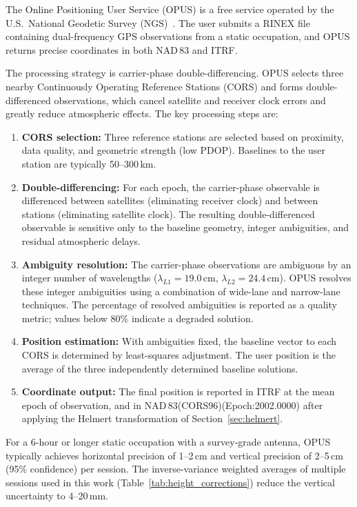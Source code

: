 The Online Positioning User Service (OPUS) is a free service operated by the U.S.\ National Geodetic Survey (NGS)~\cite{soler2003}. The user submits a RINEX file containing dual-frequency GPS observations from a static occupation, and OPUS returns precise coordinates in both NAD\,83 and ITRF.

The processing strategy is carrier-phase double-differencing. OPUS selects three nearby Continuously Operating Reference Stations (CORS) and forms double-differenced observations, which cancel satellite and receiver clock errors and greatly reduce atmospheric effects. The key processing steps are:
\begin{enumerate}[nosep]
\item \textbf{CORS selection:} Three reference stations are selected based on proximity, data quality, and geometric strength (low PDOP). Baselines to the user station are typically 50--300\,km.
\item \textbf{Double-differencing:} For each epoch, the carrier-phase observable is differenced between satellites (eliminating receiver clock) and between stations (eliminating satellite clock). The resulting double-differenced observable is sensitive only to the baseline geometry, integer ambiguities, and residual atmospheric delays.
\item \textbf{Ambiguity resolution:} The carrier-phase observations are ambiguous by an integer number of wavelengths ($\lambda_{L1} = 19.0$\,cm, $\lambda_{L2} = 24.4$\,cm). OPUS resolves these integer ambiguities using a combination of wide-lane and narrow-lane techniques. The percentage of resolved ambiguities is reported as a quality metric; values below 80\% indicate a degraded solution.
\item \textbf{Position estimation:} With ambiguities fixed, the baseline vector to each CORS is determined by least-squares adjustment. The user position is the average of the three independently determined baseline solutions.
\item \textbf{Coordinate output:} The final position is reported in ITRF at the mean epoch of observation, and in NAD\,83(CORS96)(Epoch:2002.0000) after applying the Helmert transformation of Section~\ref{sec:helmert}.
\end{enumerate}
For a 6-hour or longer static occupation with a survey-grade antenna, OPUS typically achieves horizontal precision of 1--2\,cm and vertical precision of 2--5\,cm (95\% confidence) per session. The inverse-variance weighted averages of multiple sessions used in this work (Table~\ref{tab:height_corrections}) reduce the vertical uncertainty to 4--20\,mm.


